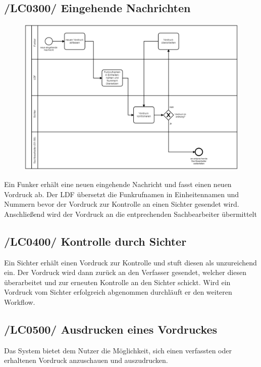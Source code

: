 \newpage
\subsection{/LC0300/ Eingehende Nachrichten} 

\begin{figure}[htpb]
	\centering
	\includegraphics[width=0.95\linewidth]{eingehend.png}
\end{figure}
\FloatBarrier

Ein Funker erhält eine neuen eingehende Nachricht und fasst einen neuen Vordruck ab. Der LDF übersetzt die Funkrufnamen in Einheitennamen und Nummern
bevor der Vordruck zur Kontrolle an einen Sichter gesendet wird. Anschließend wird der Vordruck an die entprechenden Sachbearbeiter übermittelt

\subsection{/LC0400/ Kontrolle durch Sichter}
Ein Sichter erhält einen Vordruck zur Kontrolle und stuft diesen als unzureichend ein. Der Vordruck wird dann zurück an den Verfasser gesendet, welcher diesen
überarbeitet und zur erneuten Kontrolle an den Sichter schickt. Wird ein Vordruck vom Sichter erfolgreich abgenommen durchläuft er den weiteren Workflow.

\subsection{/LC0500/ Ausdrucken eines Vordruckes}
Das System bietet dem Nutzer die Möglichkeit, sich einen verfassten oder erhaltenen Vordruck anzuschauen und auszudrucken.